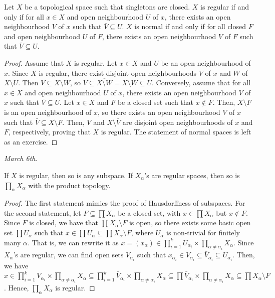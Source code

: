 \begin{theorem}
    Let $X$ be a topological space such that singletons are closed. $X$ is regular if and only if for all $x \in X$ and open neighbourhood $U$ of $x$, there exists an open neighbourhood $V$ of $x$ such that $\bar{V} \subseteq U$. $X$ is normal if and only if for all closed $F$ and open neighbourhood $U$ of $F$, there exists an open neighbourhood $V$ of $F$ such that $\bar{V} \subseteq U$.
\end{theorem}


\begin{proof}
    Assume that $X$ is regular. Let $x \in X$ and $U$ be an open neighbourhood of $x$. Since $X$ is regular, there exist disjoint open neighbourhoods $V$ of $x$ and $W$ of $X \setminus U$. Then $V \subseteq X \setminus W$, so $\bar{V} \subseteq \overline{X \setminus W} = X \setminus W \subseteq U$. Conversely, assume that for all $x \in X$ and open neighbourhood $U$ of $x$, there exists an open neighbourhood $V$ of $x$ such that $\bar{V} \subseteq U$. Let $x \in X$ and $F$ be a closed set such that $x \notin F$. Then, $X \setminus F$ is an open neighbourhood of $x$, so there exists an open neighbourhood $V$ of $x$ such that $\bar{V} \subseteq X \setminus F$. Then, $V$ and $X \setminus \bar{V}$ are disjoint open neighbourhoods of $x$ and $F$, respectively, proving that $X$ is regular. The statement of normal spaces is left as an exercise.
\end{proof}

\textit{March 6th.}

\begin{lemma}
    If $X$ is regular, then so is any subspace. If $X_{\alpha}$'s are regular spaces, then so is $\prod_{\alpha} X_{\alpha}$ with the product topology.
\end{lemma}

\begin{proof}
    The first statement mimics the proof of Hausdorffness of subspaces. For the second statement, let $F \subseteq \prod X_{\alpha}$ be a closed set, with $x \in \prod X_{\alpha}$ but $x \notin F$. Since $F$ is closed, we have that $\prod X_{\alpha} \setminus F$ is open, so there exists some basic open set $\prod U_{\alpha}$ such that $x \in \prod U_{\alpha} \subseteq \prod X_{\alpha} \setminus F$, where $U_{\alpha}$ is non-trivial for finitely many $\alpha$. That is, we can rewrite it as $x = (x_{\alpha}) \in \prod_{i=1}^{k} U_{\alpha_{i}} \times \prod_{\alpha \neq \alpha_{i}} X_{\alpha}$. Since $X_{\alpha}$'s are regular, we can find open sets $V_{\alpha_{i}}$ such that $x_{\alpha_{i}} \in V_{\alpha_{i}} \subseteq \bar{V}_{\alpha_{i}} \subseteq U_{\alpha_{i}}$. Then, we have $x \in \prod_{i=1}^{k} V_{\alpha_{i}} \times \prod_{\alpha \neq \alpha_{i}} X_{\alpha} \subseteq \prod_{i=1}^{k} \bar{V}_{\alpha_{i}} \times \prod_{\alpha \neq \alpha_{i}} X_{\alpha} \subseteq \prod \bar{V}_{\alpha_{i}} \times \prod_{\alpha \neq \alpha_{i}} X_{\alpha} \subseteq \prod X_{\alpha} \setminus F$. Hence, $\prod_{\alpha} X_{\alpha}$ is regular.
\end{proof}

